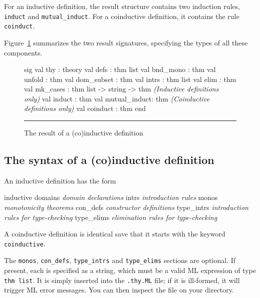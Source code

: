 For an inductive definition, the result structure contains two induction rules,
{\tt induct} and \verb|mutual_induct|.  For a coinductive definition, it
contains the rule \verb|coinduct|.

Figure~\ref{def-result-fig} summarizes the two result signatures,
specifying the types of all these components.

\begin{figure}
\begin{ttbox}
sig
val thy          : theory
val defs         : thm list
val bnd_mono     : thm
val unfold       : thm
val dom_subset   : thm
val intrs        : thm list
val elim         : thm
val mk_cases     : thm list -> string -> thm
{\it(Inductive definitions only)} 
val induct       : thm
val mutual_induct: thm
{\it(Coinductive definitions only)}
val coinduct    : thm
end
\end{ttbox}
\hrule
\caption{The result of a (co)inductive definition} \label{def-result-fig}
\end{figure}

\subsection{The syntax of a (co)inductive definition}
An inductive definition has the form
\begin{ttbox}
inductive
  domains    {\it domain declarations}
  intrs      {\it introduction rules}
  monos      {\it monotonicity theorems}
  con_defs   {\it constructor definitions}
  type_intrs {\it introduction rules for type-checking}
  type_elims {\it elimination rules for type-checking}
\end{ttbox}
A coinductive definition is identical save that it starts with the keyword
{\tt coinductive}.  

The {\tt monos}, {\tt con\_defs}, {\tt type\_intrs} and {\tt type\_elims}
sections are optional.  If present, each is specified as a string, which
must be a valid ML expression of type {\tt thm list}.  It is simply
inserted into the {\tt .thy.ML} file; if it is ill-formed, it will trigger
ML error messages.  You can then inspect the file on your directory.

